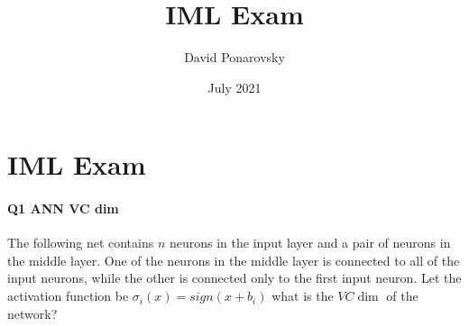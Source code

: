 \documentclass{article}
\title{IML Exam}
\author{David Ponarovsky}
\date{July 2021}
\begin{document}
\newcommand{\xy}{\mathbf{x^{\prime}}, \mathbf{y^{\prime}}}
\newcommand{\xxo }{ \mathbf{x^{\prime}}_1 }
\newcommand{\zoo}{ \begin{bmatrix} 
\frac{1}{2}\cdot(-1)^{z_1} + \frac{1}{3}\cdot(-1) ^{z_3} \\
\frac{1}{2}\cdot(-1)^{z_2} + \frac{1}{3}\cdot(-1) ^{z_4} 
\end{bmatrix}  }
\maketitle

\section{IML Exam}
\paragraph{Q1 ANN VC dim}
The following net contains \( n \) neurons in the input layer and a pair of neurons in the middle layer. One of the neurons in the middle layer is connected to all of the input neurons, while the other is connected only to the first input neuron.  Let the activation function be \( \sigma_{i} (x) = sign(x + b_{i}) \) what is the \( VC \dim \) of the network? 

\paragraph{}

\end{document}
